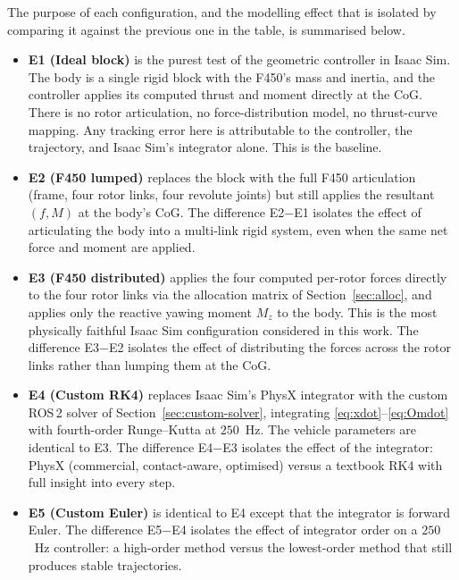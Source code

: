 \documentclass[11pt]{article}
\theoremstyle{remark}
\begin{document}
The purpose of each configuration, and the modelling effect that is isolated by comparing it against the previous one in the table, is summarised below.

\begin{itemize}
    \item \textbf{E1 (Ideal block)} is the purest test of the geometric controller in Isaac Sim. The body is a single rigid block with the F450's mass and inertia, and the controller applies its computed thrust and moment directly at the CoG. There is no rotor articulation, no force-distribution model, no thrust-curve mapping. Any tracking error here is attributable to the controller, the trajectory, and Isaac Sim's integrator alone. This is the baseline.

    \item \textbf{E2 (F450 lumped)} replaces the block with the full F450 articulation (frame, four rotor links, four revolute joints) but still applies the resultant $(f, M)$ at the body's CoG. The difference E2$-$E1 isolates the effect of articulating the body into a multi-link rigid system, even when the same net force and moment are applied.

    \item \textbf{E3 (F450 distributed)} applies the four computed per-rotor forces directly to the four rotor links via the allocation matrix of Section~\ref{sec:alloc}, and applies only the reactive yawing moment $M_z$ to the body. This is the most physically faithful Isaac Sim configuration considered in this work. The difference E3$-$E2 isolates the effect of distributing the forces across the rotor links rather than lumping them at the CoG.

    \item \textbf{E4 (Custom RK4)} replaces Isaac Sim's PhysX integrator with the custom ROS\,2 solver of Section~\ref{sec:custom-solver}, integrating \eqref{eq:xdot}--\eqref{eq:Omdot} with fourth-order Runge--Kutta at $250$~Hz. The vehicle parameters are identical to E3. The difference E4$-$E3 isolates the effect of the integrator: PhysX (commercial, contact-aware, optimised) versus a textbook RK4 with full insight into every step.

    \item \textbf{E5 (Custom Euler)} is identical to E4 except that the integrator is forward Euler. The difference E5$-$E4 isolates the effect of integrator order on a $250$~Hz controller: a high-order method versus the lowest-order method that still produces stable trajectories.
\end{itemize}
\end{document}
